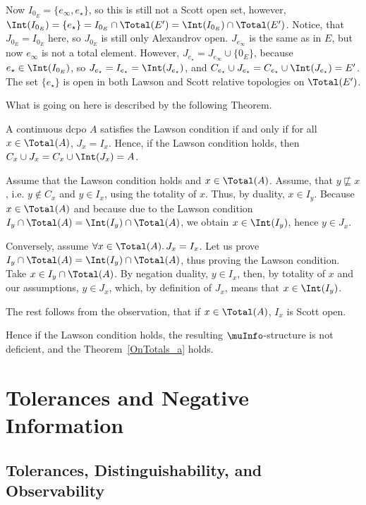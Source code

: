 Now $I_{0_E} = \{e_{\infty},e_{\star}\}$, so 
this is still not a Scott open set,
however, $\Int(I_{0_E}) = \{e_{\star}\} = 
I_{0_E} \cap \Total(E') = \Int(I_{0_E}) \cap
\Total(E')$. Notice, that $J_{0_E} = I_{0_E}$ here, 
so $J_{0_E}$ is still only
Alexandrov open. $J_{e_{\infty}}$ 
is the same as in $E$, but now $e_{\infty}$ is not
a total element. However, $J_{e_{\star}} = J_{e_{\infty}} \cup 
\{0_E\}$, because
$e_{\star} \in \Int(I_{0_E})$, so $J_{e_{\star}} = 
I_{e_{\star}} = \Int(J_{e_{\star}})$, and
$C_{e_{\star}} \cup J_{e_{\star}} = 
C_{e_{\star}} \cup \Int(J_{e_{\star}}) = E'$. The set $\{e_{\star}\}$
is open in both Lawson and Scott relative topologies on
$\Total(E')$.

What is going on here is described by the following Theorem.

\begin{theorem} A continuous dcpo $A$ satisfies the Lawson condition
if and only if
for all $x \in \Total(A)$, $J_x = I_x$.
Hence, if the Lawson condition holds, then
$C_x \cup J_x = C_x \cup \Int(J_x) = A$.
\end{theorem}
\Proof
Assume that the Lawson condition holds and $x \in \Total(A)$.
Assume, that $y \not\sqsubseteq x$, i.e. $y \not\in C_x$ and
$y \in I_x$, using the totality of $x$.
Thus, by duality, $x \in I_y$. Because $x \in \Total(A)$ and
because due to the 
Lawson condition $I_y \cap \Total(A) = \Int(I_y) \cap \Total(A)$,
we obtain $x \in \Int(I_y)$, hence $y \in J_x$. 

Conversely, assume $\forall x \in \Total(A).\,J_x =I_x$.
Let us prove $I_y \cap \Total(A) = \Int(I_y) \cap \Total(A)$,
thus proving the Lawson condition.
Take $x \in I_y \cap \Total(A)$. By negation duality, 
$y \in I_x$, then, by totality 
of $x$ and our assumptions, $y \in J_x$, which, by definition of $J_x$,
means that $x \in \Int(I_y)$. 

The rest follows from the observation,
that if $x \in \Total(A)$, $I_x$ is Scott open.
\eproof

Hence if the Lawson condition holds, the resulting $\muInfo$-structure
is not deficient, and the Theorem~\ref{OnTotals_a} holds.



\section{Tolerances and Negative Information}\label{sec:smyth}

\subsection{Tolerances, Distinguishability, and Observability}

